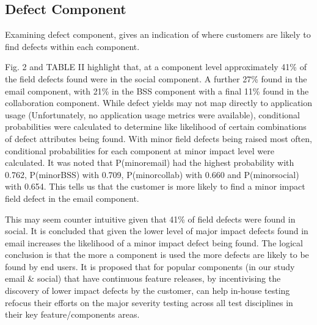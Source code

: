 \documentclass[conference]{IEEEtran}
\begin{document}
\subsection{Defect Component}

Examining defect component, gives an indication of where customers are likely to find defects within each component. \par
Fig. 2 and TABLE II highlight that, at a component level approximately 41\% of the field defects found were in the social component. A further 27\% found in the email component, with 21\% in the BSS component with a final 11\% found in the collaboration component. While defect yields may not map directly to application usage (Unfortunately, no application usage metrics were available), conditional probabilities were calculated to determine like likelihood of certain combinations of defect attributes being found. With minor field defects being raised most often, conditional probabilities  for each component at minor impact level were calculated. It was noted that  P(minor\textbar email) had the highest probability with 0.762, P(minor\textbar BSS) with 0.709, P(minor\textbar collab) with 0.660 and P(minor\textbar social) with 0.654. This tells us that the customer is more likely to find a minor impact field defect in the email component. \par
This may seem counter intuitive given that 41\% of field defects were found in social. It is concluded that given the lower level of major impact defects found in email increases the likelihood of a minor impact defect being found.  The logical conclusion is that the more a component is used the more defects are likely to be found by end users. It is proposed that for popular components (in our study email \& social) that have continuous feature releases, by incentivising the discovery of lower impact defects by the customer, can help in-house testing refocus their efforts on the major severity testing across all test disciplines in their key feature/components areas. 
\end{document}
